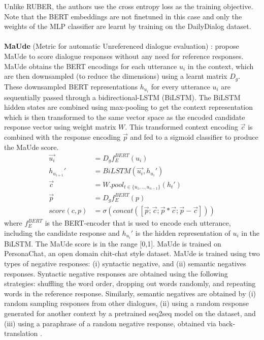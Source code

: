 Unlike RUBER, the authors use the cross entropy loss as the training objective. Note that the BERT embeddings are not finetuned in this case and only the weights of the MLP classifier are learnt by training on the DailyDialog dataset.\\ 
\\
\textbf{MaUde} (Metric for automatic Unreferenced dialogue evaluation) :  propose MaUde to score dialogue responses without any need for reference responses. MaUde obtains the BERT encodings for each utterance $u_i$ in the context, which are then downsampled (to reduce the dimensions) using a learnt matrix $D_g$. These downsampled BERT representations $h_{u_i}$ for every utterance $u_i$ are sequentially passed through a bidirectional-LSTM (BiLSTM). The BiLSTM hidden states are combined using max-pooling to get the context representation which is then transformed to the same vector space as the encoded candidate response vector using weight matrix $W$. This transformed context encoding $\overrightarrow{c}$ is combined with the response encoding $\overrightarrow{p}$ and fed to a sigmoid classifier to produce the MaUde score.
\begin{align*}
        \overrightarrow{u_i} &= D_g f_E^{BERT}(u_i)\\
    h_{u_{i+1}}' &= BiLSTM(\overrightarrow{u_i},h_{u_i}')\\
    \overrightarrow{c} &= W.pool_{t \in \{u_1,..,u_{n-1}\}}(h_t')\\
    \overrightarrow{p} &= D_g f_E^{BERT}(p)\\
    score(c, p) &= \sigma(concat([\overrightarrow{p};\overrightarrow{c};\overrightarrow{p}*\overrightarrow{c};\overrightarrow{p}-\overrightarrow{c}]))
\end{align*}
where $f_E^{BERT}$ is the BERT-encoder that is used to encode each utterance, including the candidate response and $h_{u_i}'$ is the hidden representation of $u_i$ in the BiLSTM. The MaUde score is in the range [0,1]. 
MaUde is trained on PersonaChat, an open domain chit-chat style dataset. MaUde is trained using two types of negative responses: (i) syntactic negative, and (ii) semantic negatives responses.  Syntactic negative responses are obtained using the following strategies: shuffling the word order, dropping out words randomly, and repeating words in the reference response. Similarly, semantic negatives are obtained by (i) random sampling responses from other dialogues, (ii) using a random response generated for another context by a pretrained seq2seq model on the dataset, and (iii) using a paraphrase of a random negative response, obtained via back-translation . 
